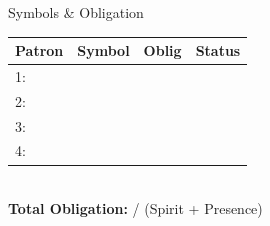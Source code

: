 \documentclass[10pt]{article}
\begin{document}
\begin{minipage}[t]{0.48\linewidth}
    \vspace{0.5em}
    
    \begin{charbox}{Symbols \& Obligation}
        \begin{tabular}{|p{2cm}|p{2cm}|p{1.5cm}|p{1.5cm}|}
            \hline
            \textbf{Patron} & \textbf{Symbol} & \textbf{Oblig} & \textbf{Status} \\
            \hline
            1: & \underline{\hspace{1.5cm}} & \underline{\hspace{1cm}} & \underline{\hspace{1.5cm}} \\
            \hline
            2: & \underline{\hspace{1.5cm}} & \underline{\hspace{1cm}} & \underline{\hspace{1.5cm}} \\
            \hline
            3: & \underline{\hspace{1.5cm}} & \underline{\hspace{1cm}} & \underline{\hspace{1.5cm}} \\
            \hline
            4: & \underline{\hspace{1.5cm}} & \underline{\hspace{1cm}} & \underline{\hspace{1.5cm}} \\
            \hline
        \end{tabular}\\
        \textbf{Total Obligation:} \underline{\hspace{1cm}} / \underline{\hspace{1.5cm}} (Spirit + Presence)
    \end{charbox}
\end{minipage}
\hfill
\end{document}
